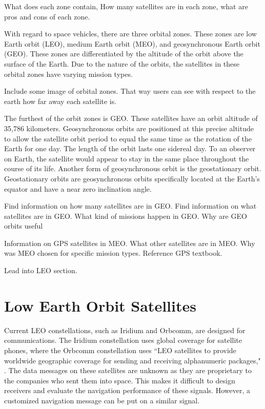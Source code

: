 \documentclass[12pt]{report}
\begin{document}
What does each zone contain, How many satellites are in each zone, what are pros and cons of each zone.

With regard to space vehicles, there are three orbital zones. These zones are low Earth orbit (LEO), medium Earth orbit (MEO), and geosynchronous Earth orbit (GEO). These zones are differentiated by the altitude of the orbit above the surface of the Earth. Due to the nature of the orbits, the satellites in these orbital zones have varying mission types. 

Include some image of orbital zones. That way users can see with respect to the earth how far away each satellite is. 


The furthest of the orbit zones is GEO. These satellites have an orbit altitude of 35,786 kilometers. Geosynchronous orbits are positioned at this precise altitude to allow the satellite orbit period to equal the same time as the rotation of the Earth for one day. The length of the orbit lasts one sidereal day. To an observer on Earth, the satellite would appear to stay in the same place throughout the course of its life. Another form of geosynchronous orbit is the geostationary orbit. Geostationary orbits are geosynchronous orbits specifically located at the Earth's equator and have a near zero inclination angle. 

Find information on how many satellites are in GEO. Find information on what satellites are in GEO. What kind of missions happen in GEO. Why are GEO orbits useful 


Information on GPS satellites in MEO. What other satellites are in MEO. Why was MEO chosen for specific mission types. Reference GPS textbook. \cite{misraGlobalPositioningSystem2012}

Lead into LEO section. 

\section{Low Earth Orbit Satellites}
Current LEO constellations, such as Iridium and Orbcomm, are designed for communications. The Iridium constellation uses global coverage for satellite phones, where the Orbcomm constellation uses ``LEO satellites to provide worldwide geographic coverage for sending and receiving alphanumeric packages," \cite{orabiOpportunisticNavigationDoppler2021}. The data messages on these satellites are unknown as they are proprietary to the companies who sent them into space. This makes it difficult to design receivers and evaluate the navigation performance of these signals. However, a customized navigation message can be put on a similar signal. 
\end{document}
